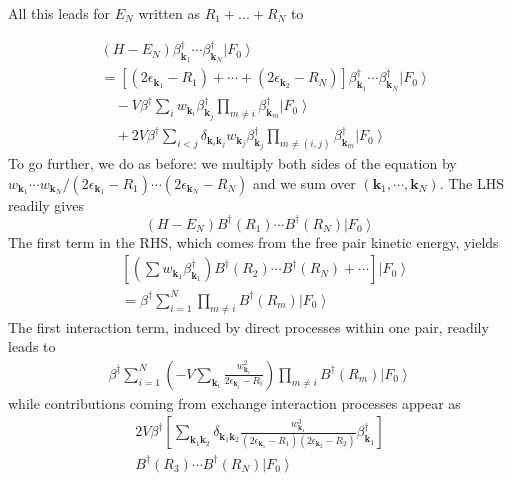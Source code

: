 \documentclass[epj]{svjour}
\newcommand{\vk}{\ensuremath{\mathbf{k}}}
\begin{document}
All this leads for $E_N$ written as $R_1+...+R_N$ to


\begin{equation}\label{eq:HN2}
\begin{split}
&(H-E_N)\beta^{\dagger}_{\mathbf{k} _1}\cdots\beta^{\dagger}_{\mathbf{k}
_N}\left|F_0\right> \\
&=[(2\epsilon_{\vk_1}-R_1)+\cdots+(2\epsilon_{\vk_2}-R_N)]\beta^\dagger_{\vk_1}\cdots\beta^\dagger_{\vk_N}\left|F_0\right>  \\
&\quad-V\beta^\dagger \sum_{i}w_{\vk_i}\beta^\dagger_{\vk_j}\prod_{m\neq{}i}\beta^{\dagger}_{\mathbf{k} _m} \left|F_0\right>  \\
&\quad+2V\beta^\dagger\sum_{i<j}\delta_{\vk_i\vk_j}w_{\vk_j}\beta^\dagger_{\vk_j}\prod_{m\neq(i,j)}\beta^{\dagger}_{\mathbf{k} _m} \left|F_0\right>  
\end{split}
\end{equation}
To go further, we do as before: we multiply both sides of the equation by $w_{\vk_1}\cdots{}w_{\vk_N}/(2\epsilon_{\vk_1}-R_1)\cdots(2\epsilon_{\vk_N}-R_N)$ and we sum over $(\vk_1,\cdots,\vk_N)$.  
The LHS readily gives
\begin{equation}
(H-E _N)B^{\dagger} (R_1)\cdots{}B^{\dagger}(R_N)\left|F_0\right> 
\end{equation}
The first term in the RHS, which comes from the free pair kinetic energy, yields
\begin{equation}
\begin{split}
&[(\sum{}w_{\vk_1}\beta^\dagger_{\vk_1})B^\dagger(R_2)\cdots{}B^\dagger(R_N)+\cdots]\left|F_0\right>\\
&=\beta^\dagger\sum_{i=1}^N\prod_{m\neq{i}}B^\dagger(R_m)\left|F_0\right> 
\end{split}
\end{equation}
The first interaction term, induced by direct processes within one pair, readily leads to 
\begin{equation}
\begin{split}
\beta^\dagger\sum_{i=1}^N(-V\sum_{\vk_i}\frac{w_{\mathbf{k} _i}^2}{2\epsilon_{\mathbf{k} _i}-R_i})\prod_{m\neq{i}}B^\dagger(R_m)\left|F_0\right> 
\end{split}
\end{equation}
while contributions coming from exchange interaction processes appear as
\begin{equation}
\begin{split}
2V\beta^\dagger\left[\sum_{\vk_1\vk_2}\delta_{\vk_1\vk_2}\frac{w^3_{\mathbf{k} _1}}{(2\epsilon_{\mathbf{k} _1}-R_1)(2\epsilon_{\mathbf{k} _2}-R_2)}\beta^\dagger_{\vk_1}\right]\\B^\dagger(R_3)\cdots{}B^\dagger(R_N)\left|F_0\right> 
\end{split}
\end{equation}
\end{document}
